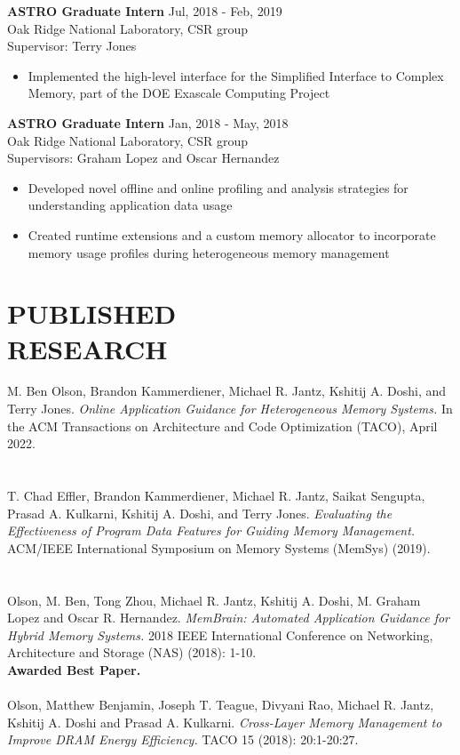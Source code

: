 \documentclass[margin,11pt]{res} %
\begin{document}
\begin{resume}
  {\textbf{ASTRO Graduate Intern}} \hfill Jul, 2018 - Feb, 2019 \\
   Oak Ridge National Laboratory, CSR group \\
   Supervisor: Terry Jones
    \begin{itemize} \itemsep -2pt
      \item Implemented the high-level interface for the Simplified Interface
            to Complex Memory, part of the DOE Exascale Computing Project
    \end{itemize}

  {\textbf{ASTRO Graduate Intern}} \hfill Jan, 2018 - May, 2018 \\
   Oak Ridge National Laboratory, CSR group \\
   Supervisors: Graham Lopez and Oscar Hernandez
    \begin{itemize} \itemsep -2pt
      \item Developed novel offline and online profiling and analysis
            strategies for understanding application data usage
      \item Created runtime extensions and a custom memory allocator to
            incorporate memory usage profiles during heterogeneous memory
            management
    \end{itemize}


\section{PUBLISHED\\RESEARCH}
  {M. Ben Olson, Brandon Kammerdiener, Michael R. Jantz, Kshitij A. Doshi, and Terry Jones. \textit{Online Application Guidance for Heterogeneous Memory Systems.} In the ACM Transactions on Architecture and Code Optimization (TACO), April 2022.} \\
  \\\\
  {T. Chad Effler, Brandon Kammerdiener, Michael R. Jantz, Saikat Sengupta, Prasad A. Kulkarni, Kshitij A. Doshi, and Terry Jones. \textit{Evaluating the Effectiveness of Program Data Features for Guiding Memory Management.} ACM/IEEE International Symposium on Memory Systems (MemSys) (2019).} \\
  \\\\
  {Olson, M. Ben, Tong Zhou, Michael R. Jantz, Kshitij A. Doshi, M. Graham Lopez and Oscar R. Hernandez. \textit{MemBrain: Automated Application Guidance for Hybrid Memory Systems.} 2018 IEEE International Conference on Networking, Architecture and Storage (NAS) (2018): 1-10. \\
  \textbf{Awarded Best Paper.}}
  \\\\
  {Olson, Matthew Benjamin, Joseph T. Teague, Divyani Rao, Michael R. Jantz, Kshitij A. Doshi and Prasad A. Kulkarni. \textit{Cross-Layer Memory Management to Improve DRAM Energy Efficiency.} TACO 15 (2018): 20:1-20:27.}



\end{resume}
\end{document}
